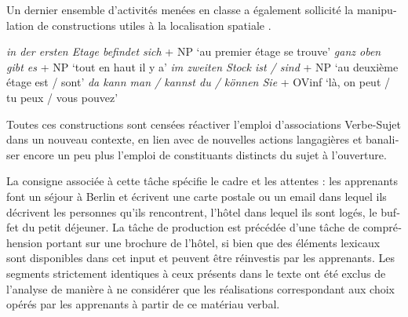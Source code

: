 \documentclass[output=paper]{langscibook}
\begin{document}
\begin{otherlanguage}{french}
Un dernier ensemble d’activités menées en classe a également sollicité la manipulation de constructions utiles à la localisation spatiale .

\ea%
    \label{ex:felce:12}
   \ea \textit{in der ersten Etage befindet sich} + NP `au premier étage se trouve'
   \ex \textit{ganz oben gibt es} + NP `tout en haut il y a'
   \ex \textit{im zweiten Stock ist / sind} + NP `au deuxième étage est / sont'
   \ex \textit{da kann man / kannst du / können Sie} + OVinf `là, on peut / tu peux / vous pouvez'
    \z
\z

Toutes ces constructions sont censées réactiver l’emploi d’associations Verbe-Sujet dans un nouveau contexte, en lien avec de nouvelles actions langagières et banaliser encore un peu plus l’emploi de constituants distincts du sujet à l’ouverture.

La consigne associée à cette tâche spécifie le cadre et les attentes : les apprenants font un séjour à Berlin et écrivent une carte postale ou un email dans lequel ils décrivent les personnes qu’ils rencontrent, l’hôtel dans lequel ils sont logés, le buffet du petit déjeuner. La tâche de production est précédée d’une tâche de compréhension portant sur une brochure de l’hôtel, si bien que des éléments lexicaux sont disponibles dans cet input et peuvent être réinvestis par les apprenants. Les segments strictement identiques à ceux présents dans le texte ont été exclus de l’analyse de manière à ne considérer que les réalisations correspondant aux choix opérés par les apprenants à partir de ce matériau verbal.


\end{otherlanguage}
\end{document}
